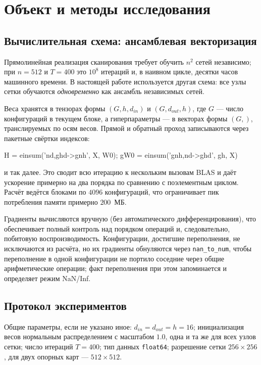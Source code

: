 \section{Объект и методы исследования}\label{sec:methods}

\subsection{Вычислительная схема: ансамблевая векторизация}

Прямолинейная реализация сканирования требует обучить $n^2$ сетей независимо;
при $n=512$ и $T=400$ это $10^8$ итераций и, в наивном цикле, десятки часов
машинного времени. В настоящей работе используется другая схема: все узлы
сетки обучаются \emph{одновременно} как ансамбль независимых сетей.

Веса хранятся в тензорах формы $(G, h, d_{in})$ и $(G, d_{out}, h)$, где
$G$ --- число конфигураций в текущем блоке, а гиперпараметры --- в векторах
формы $(G,)$, транслируемых по осям весов. Прямой и обратный проход
записываются через пакетные свёртки индексов:
\begin{center}
\ttfamily\small
H = einsum('nd,ghd->gnh', X, W0);\quad
gW0 = einsum('gnh,nd->ghd', gh, X)
\end{center}
и так далее. Это сводит всю итерацию к нескольким вызовам BLAS и даёт
ускорение примерно на два порядка по сравнению с поэлементным циклом.
Расчёт ведётся блоками по $4096$ конфигураций, что ограничивает пик потребления
памяти примерно $200$~МБ.

Градиенты вычисляются вручную (без автоматического дифференцирования), что
обеспечивает полный контроль над порядком операций и, следовательно, побитовую
воспроизводимость. Конфигурации, достигшие переполнения, не исключаются из
расчёта, но их градиенты обнуляются через \texttt{nan\_to\_num}, чтобы
переполнение в одной конфигурации не портило соседние через общие
арифметические операции; факт переполнения при этом запоминается и определяет
режим NaN/Inf.

\subsection{Протокол экспериментов}

Общие параметры, если не указано иное: $d_{in}=d_{out}=h=16$; инициализация
весов нормальным распределением с масштабом $1.0$, одна и та же для всех узлов
сетки; число итераций $T=400$; тип данных \texttt{float64}; разрешение сетки
$256\times256$, для двух опорных карт --- $512\times512$.

